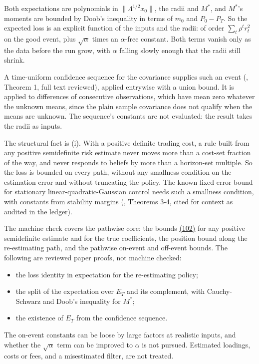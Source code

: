 \documentclass[11pt]{article}
\begin{document}
Both expectations are polynomials in \(\|\Lambda^{1/2}x_0\|\), the radii and
\(M^*\), and \(M^*\)'s moments are bounded by Doob's inequality in terms of
\(m_0\) and \(P_0-P_T\). So the expected loss is an explicit function of
the inputs and the radii: of order \(\sum_t\rho^tr_t^2\) on the good event,
plus \(\sqrt\alpha\) times an \(\alpha\)-free constant. Both terms vanish only as
the data before the run grow, with \(\alpha\) falling slowly enough that
the radii still shrink.

A time-uniform confidence sequence for the covariance supplies such an
event (\cite{howard2021time}, Theorem 1, full text reviewed), applied
entrywise with a union bound. It is applied to differences of
consecutive observations, which have mean zero whatever the unknown
means, since the plain sample covariance does not qualify when the
means are unknown. The sequence's constants are not evaluated: the
result takes the radii as inputs.

The structural fact is (i). With a positive definite trading cost, a
rule built from any positive semidefinite risk estimate never moves
more than a cost-set fraction of the way, and never responds to
beliefs by more than a horizon-set multiple. So the loss is bounded on
every path, without any smallness condition on the estimation error
and without truncating the policy. The known fixed-error bound for
stationary linear-quadratic-Gaussian control needs such a smallness
condition, with constants from stability margins (\cite{mania2019certainty},
Theorems 3-4, cited for context as audited in the ledger).

The machine check covers the pathwise core: the bounds \hyperref[eq:102]{(102)} for any
positive semidefinite estimate and for the true coefficients, the
position bound along the re-estimating path, and the pathwise on-event
and off-event bounds. The following are reviewed paper proofs, not
machine checked:

\begin{itemize}
  \item the loss identity in expectation for the re-estimating policy;
  \item the split of the expectation over \(E_T\) and its complement, with
  Cauchy-Schwarz and Doob's inequality for \(M^*\);
  \item the existence of \(E_T\) from the confidence sequence.
\end{itemize}

The on-event constants can be loose by large factors at realistic
inputs, and whether the \(\sqrt\alpha\) term can be improved to \(\alpha\) is not
pursued. Estimated loadings, costs or fees, and a misestimated filter,
are not treated.
\end{document}
